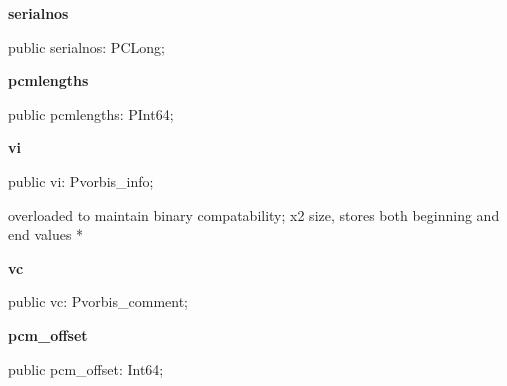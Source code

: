 \documentclass{report}
\newif\ifpdf
\begin{document}
\begin{list}{}
\begin{flushleft}
\ifpdf
\end{flushleft}
\fi


\par  \label{ok_vorbisfile.TOggVorbis_File-serialnos}
\item[\textbf{serialnos}\hfill]
\ifpdf
\begin{flushleft}
\fi
\begin{ttfamily}
public serialnos: PCLong;\end{ttfamily}

\ifpdf
\end{flushleft}
\fi


\par  \label{ok_vorbisfile.TOggVorbis_File-pcmlengths}
\item[\textbf{pcmlengths}\hfill]
\ifpdf
\begin{flushleft}
\fi
\begin{ttfamily}
public pcmlengths: PInt64;\end{ttfamily}

\ifpdf
\end{flushleft}
\fi


\par  \label{ok_vorbisfile.TOggVorbis_File-vi}
\item[\textbf{vi}\hfill]
\ifpdf
\begin{flushleft}
\fi
\begin{ttfamily}
public vi: Pvorbis{\_}info;\end{ttfamily}

\ifpdf
\end{flushleft}
\fi


\par * overloaded to maintain binary compatability; x2 size, stores both beginning and end values *\label{ok_vorbisfile.TOggVorbis_File-vc}
\item[\textbf{vc}\hfill]
\ifpdf
\begin{flushleft}
\fi
\begin{ttfamily}
public vc: Pvorbis{\_}comment;\end{ttfamily}

\ifpdf
\end{flushleft}
\fi


\par  \label{ok_vorbisfile.TOggVorbis_File-pcm_offset}
\item[\textbf{pcm{\_}offset}\hfill]
\ifpdf
\begin{flushleft}
\fi
\begin{ttfamily}
public pcm{\_}offset: Int64;\end{ttfamily}


\end{flushleft}
\end{list}
\end{document}
